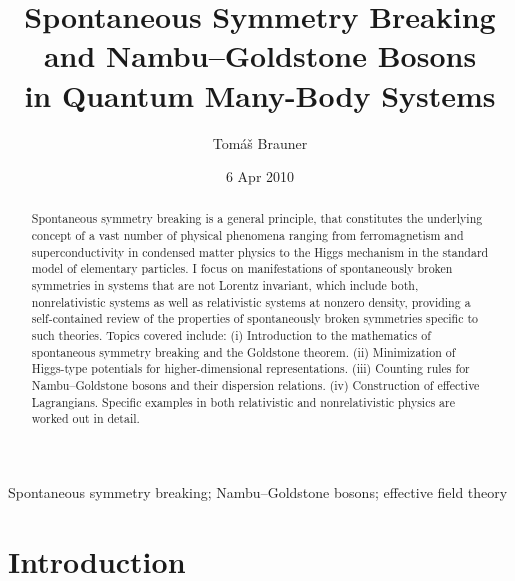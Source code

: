 \documentclass[final,2p,times,12pt,sort&compress]{elsarticle}
\date{6 Apr 2010}
\begin{document}
\begin{frontmatter}

\title{Spontaneous Symmetry Breaking and Nambu--Goldstone Bosons\\
in Quantum Many-Body Systems}

\author{Tom\'a\v{s} Brauner}
\address{Institute for Theoretical Physics, Goethe University, 60438
Frankfurt am Main, Germany}
\address{Department of Theoretical Physics, Nuclear Physics
Institute ASCR, 25068 \v{R}e\v{z}, Czech Republic}

\begin{abstract}
Spontaneous symmetry breaking is a general principle, that constitutes
the underlying concept of a vast number of physical phenomena ranging from
ferromagnetism and superconductivity in condensed matter physics to the Higgs
mechanism in the standard model of elementary particles. I focus on
manifestations of spontaneously broken symmetries in systems that are not
Lorentz invariant, which include both, nonrelativistic systems as well as
relativistic systems at nonzero density, providing a self-contained review of
the properties of spontaneously broken symmetries specific to such theories.
Topics covered include: (i) Introduction to the mathematics of spontaneous
symmetry breaking and the Goldstone theorem. (ii) Minimization of Higgs-type
potentials for higher-dimensional representations. (iii) Counting rules for
Nambu--Goldstone bosons and their dispersion relations. (iv) Construction of
effective Lagrangians. Specific examples in both relativistic and
nonrelativistic physics are worked out in detail.
\end{abstract}

\begin{keyword}
Spontaneous symmetry breaking; Nambu--Goldstone bosons; effective field
theory
\end{keyword}

\end{frontmatter}


\section{Introduction}
\label{sec:introduction}
\end{document}
